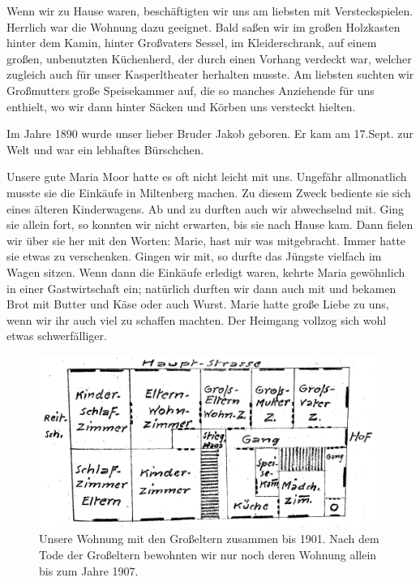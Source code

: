 \documentclass[a4paper,11pt]{article}
\begin{document}
Wenn wir zu Hause waren, beschäftigten wir uns am liebsten mit Versteckspielen. Herrlich war die Wohnung dazu geeignet. Bald saßen wir im großen Holzkasten hinter dem Kamin, hinter Großvaters Sessel, im Kleiderschrank, auf einem großen, unbenutzten Küchenherd, der durch einen Vorhang verdeckt war, welcher zugleich auch für unser Kasperltheater herhalten musste. Am liebsten suchten wir Großmutters große Speisekammer auf, die so manches Anziehende für uns enthielt, wo wir dann hinter Säcken und Körben uns versteckt hielten.

Im Jahre 1890 wurde unser lieber Bruder Jakob geboren. Er kam am 17.Sept. zur Welt und war ein lebhaftes Bürschchen.

Unsere gute Maria Moor hatte es oft nicht leicht mit uns. Ungefähr allmonatlich musste sie die Einkäufe in Miltenberg machen. Zu diesem Zweck bediente sie sich eines älteren Kinderwagens. Ab und zu durften auch wir abwechselnd mit. Ging sie allein fort, so konnten wir nicht erwarten, bis sie nach Hause kam. Dann fielen wir über sie her mit den Worten: Marie, hast mir was mitgebracht. Immer hatte sie etwas zu verschenken. Gingen wir mit, so durfte das Jüngste vielfach im Wagen sitzen. Wenn dann die Einkäufe erledigt waren, kehrte Maria gewöhnlich in einer Gastwirtschaft ein; natürlich durften wir dann auch mit und bekamen Brot mit Butter und Käse oder auch Wurst. Marie hatte große Liebe zu uns, wenn wir ihr auch viel zu schaffen machten. Der Heimgang vollzog sich wohl etwas schwerfälliger.	

\begin{figure}
    \centering
    \includegraphics[width=1\linewidth]{Grundriss Wohnung Kleinheubach.png}
    \caption{Unsere Wohnung mit den Großeltern zusammen bis 1901. Nach dem Tode der Großeltern bewohnten wir nur noch deren Wohnung allein bis zum Jahre 1907.}
    \label{fig:Grundriss Wohnung Kleinheubach}
\end{figure}
\end{document}
